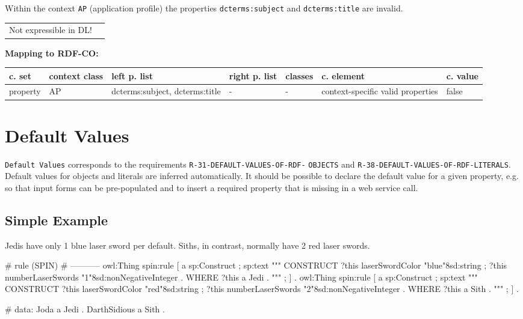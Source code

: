 \documentclass{llncs}
\newcommand{\ms}[1]{\texttt{#1}}
\newenvironment{gcotable}{
  \scriptsize
  \sffamily
  \vspace{0cm}
	\begin{center}
	\textbf{\vspace{0.4cm}Mapping to RDF-CO:} \\
  \begin{tabular}{l|l|l|l|l|l|l}
	\hline
  \textbf{c. set} & \textbf{context class} & \textbf{left p. list} & \textbf{right p. list} & \textbf{classes} & \textbf{c. element} & \textbf{c. value} \\
  \hline

}{
  \hline
  \end{tabular}
	\end{center}
}
\newenvironment{DL}{
\vspace{0cm}
	\begin{center}
  \begin{tabular}{r l}

}{
  \end{tabular}
	\end{center}
}
\begin{document}
Within the context \ms{AP} (application profile) the properties \ms{dcterms:subject} and \ms{dcterms:title} are invalid.

\begin{DL}
Not expressible in DL!
\end{DL}

\begin{gcotable}
property & AP & dcterms:subject, dcterms:title & - & - & context-specific valid properties & false \\
\end{gcotable}

\section{Default Values}

\ms{Default Values} corresponds to the requirements
\ms{R-31-DEFAULT-VALUES-OF-RDF-} \ms{OBJECTS} and
\ms{R-38-DEFAULT-VALUES-OF-RDF-LITERALS}.
Default values for objects and literals are inferred automatically.
It should be possible to declare the default value for a given property, e.g. so that input forms can be pre-populated and to insert a required property that is missing in a web service call. 

\subsection{Simple Example}

Jedis have only 1 blue laser sword per default.
Siths, in contrast, normally have 2 red laser swords.

\begin{ex}
# rule (SPIN)
# -----------
owl:Thing
    spin:rule [
        a sp:Construct ;
            sp:text """
                CONSTRUCT {            
                    ?this laserSwordColor "blue"^^xsd:string ;
                    ?this numberLaserSwords "1"^^xsd:nonNegativeInteger . 
                }
                WHERE {             
                    ?this a Jedi .            
                } """ ; ] .
owl:Thing
    spin:rule [
        a sp:Construct ;
            sp:text """
                CONSTRUCT {
                    ?this laserSwordColor "red"^^xsd:string ;
                    ?this numberLaserSwords "2"^^xsd:nonNegativeInteger . 
                }
                WHERE {             
                    ?this a Sith .            
                } """ ; ] .
\end{ex}

\begin{ex}
# data:
Joda a Jedi .
DarthSidious a Sith .
\end{ex}
\end{document}
